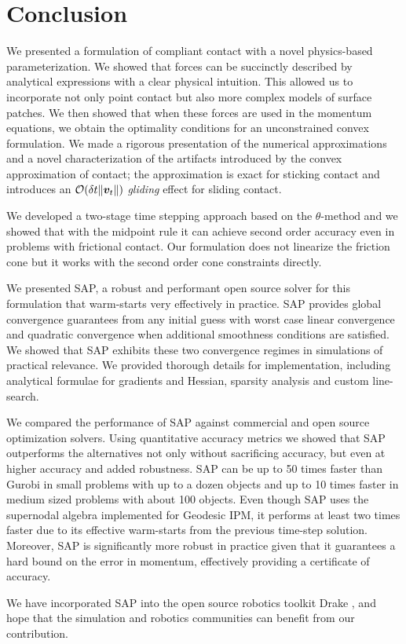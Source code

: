\section{Conclusion}
\label{sec:future_directions}

We presented a formulation of compliant contact with a novel physics-based
parameterization. We showed that forces can be succinctly described by analytical
expressions with a clear physical intuition. This allowed us to incorporate not
only point contact but also more complex models of surface patches. We then showed
that when these forces are used in the momentum equations, we obtain the
optimality conditions for an unconstrained convex formulation. We made a
rigorous presentation of the numerical approximations and a novel
characterization of the artifacts introduced by the convex approximation of
contact; the approximation is exact for sticking contact and introduces an
$\mathcal{O}(\delta t\|{\bm{v}}_t\|)$ \emph{gliding} effect for sliding contact.

We developed a two-stage time stepping approach based on the
$\theta\text{-method}$ and we showed that with the midpoint rule it can achieve
second order accuracy even in problems with frictional contact. Our formulation
does not linearize the friction cone but it works with the second order cone
constraints directly.

We presented SAP, a robust and performant open source solver for this formulation that
warm-starts very effectively in practice. SAP provides global convergence guarantees
from any initial guess with worst case linear convergence and quadratic
convergence when additional smoothness conditions are satisfied. We showed that SAP
exhibits these two convergence regimes in simulations of practical relevance. We
provided thorough details for implementation, including analytical
formulae for gradients and Hessian, sparsity analysis and custom line-search.

We compared the performance of SAP against commercial and open source
optimization solvers. Using quantitative accuracy metrics we showed that SAP
outperforms the alternatives not only without sacrificing accuracy, but even at
higher accuracy and added robustness. SAP can be up to 50 times faster than
Gurobi in small problems with up to a dozen objects and up to 10 times faster in
medium sized problems with about 100 objects. Even though SAP uses the
supernodal algebra implemented for Geodesic IPM, it performs at least two times
faster due to its effective warm-starts from the previous time-step
solution. Moreover, SAP is significantly more robust in practice given
that it guarantees a hard bound on the error in momentum, effectively providing
a certificate of accuracy.

We have incorporated SAP into the open source robotics toolkit Drake
\cite{bib:drake}, and hope that the simulation and robotics communities can
benefit from our contribution.
